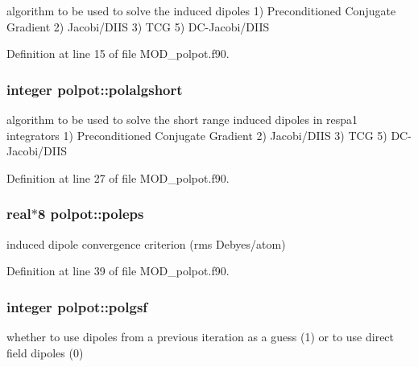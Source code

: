 algorithm to be used to solve the induced dipoles 1) Preconditioned Conjugate Gradient 2) Jacobi/\-D\-I\-I\-S 3) T\-C\-G 5) D\-C-\/\-Jacobi/\-D\-I\-I\-S 



Definition at line 15 of file M\-O\-D\-\_\-polpot.\-f90.

\hypertarget{classpolpot_ab80e82f537a8a27d27007ece284e55bd}{
\subsubsection[{polalgshort}]{\setlength{\rightskip}{0pt plus 5cm}integer polpot\-::polalgshort}}\label{classpolpot_ab80e82f537a8a27d27007ece284e55bd}


algorithm to be used to solve the short range induced dipoles in respa1 integrators 1) Preconditioned Conjugate Gradient 2) Jacobi/\-D\-I\-I\-S 3) T\-C\-G 5) D\-C-\/\-Jacobi/\-D\-I\-I\-S 



Definition at line 27 of file M\-O\-D\-\_\-polpot.\-f90.

\hypertarget{classpolpot_a9fe6988d34a71ea38554d7050313b34a}{
\subsubsection[{poleps}]{\setlength{\rightskip}{0pt plus 5cm}real$\ast$8 polpot\-::poleps}}\label{classpolpot_a9fe6988d34a71ea38554d7050313b34a}


induced dipole convergence criterion (rms Debyes/atom) 



Definition at line 39 of file M\-O\-D\-\_\-polpot.\-f90.

\hypertarget{classpolpot_a238b33cf218bd1e049b7a88b714f9861}{
\subsubsection[{polgsf}]{\setlength{\rightskip}{0pt plus 5cm}integer polpot\-::polgsf}}\label{classpolpot_a238b33cf218bd1e049b7a88b714f9861}


whether to use dipoles from a previous iteration as a guess (1) or to use direct field dipoles (0) 



